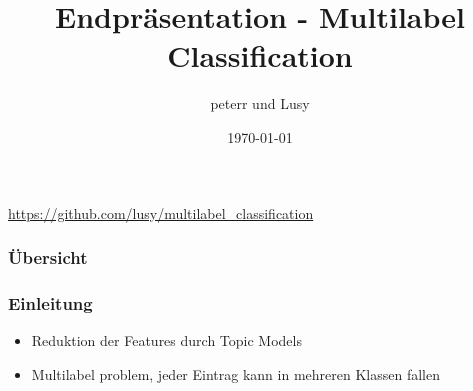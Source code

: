 \documentclass[12pt, xcolor=table]{beamer}
\begin{document}
\title{Endpräsentation - Multilabel Classification}
\author{peterr und Lusy}
\date{\today}

\begin{frame}
    \titlepage
    \begin{block}
        \tiny \url{https://github.com/lusy/multilabel\_classification}
    \end{block}
\end{frame}

\begin{frame}
    \frametitle{Übersicht}
    \tableofcontents
\end{frame}

\begin{frame}
     \frametitle{Einleitung}
     \begin{itemize}
         \item Reduktion der Features durch Topic Models
         \item Multilabel problem, jeder Eintrag  kann in mehreren Klassen fallen
     \end{itemize}
\end{frame}
\end{document}
